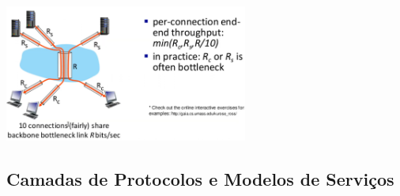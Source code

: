         \begin{center}
            \includegraphics[width=0.6\textwidth]{img/cap-01/exemplo-vazao2.png}
        \end{center}

    \subsection{Camadas de Protocolos e Modelos de Serviços}

